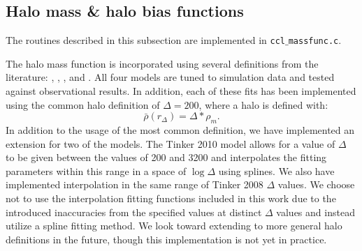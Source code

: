 \documentclass[\docopts]{\docclass}
\begin{document}
%
%
%


\subsection{Halo mass \& halo bias functions}
\label{sec:hmf}

The routines described in this subsection are implemented in {\tt ccl$\_$massfunc.c}.

The halo mass function is incorporated using several definitions from the literature: \citet{Tinker2008}, \citet{Tinker2010}, \citet{Angulo2012}, and \citet{Watson2013}. All four models are tuned to simulation data and tested against observational results. In addition, each of these fits has been implemented using the common halo definition of $\Delta = 200$, where a halo is defined with:
\begin{equation}
\bar{\rho}(r_{\Delta}) = \Delta*\rho_m.
\end{equation}
In addition to the usage of the most common definition, we have implemented an extension for two of the models. The Tinker 2010 model allows for a value of $\Delta$ to be given between the values of 200 and 3200 and interpolates the fitting parameters within this range in a space of $\log \Delta$ using splines. We also have implemented interpolation in the same range of Tinker 2008 $\Delta$ values. We choose not to use the interpolation fitting functions included in this work due to the introduced inaccuracies from the specified values at distinct $\Delta$ values and instead utilize a spline fitting method. We look toward extending to more general halo definitions in the future, though this implementation is not yet in practice.
\end{document}
